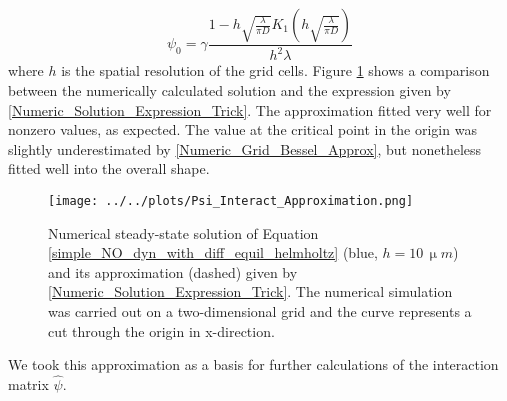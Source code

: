 \documentclass[10pt,a4paper]{article}
\begin{document}
\begin{equation}
\psi_0 = \gamma \frac{1-h\sqrt{\frac{\lambda}{\pi D}} K_1\left( h\sqrt{\frac{\lambda}{\pi D}}\right) }{h^2 \lambda}
\label{Numeric_Grid_Bessel_Approx}
\end{equation}
where $h$ is the spatial resolution of the grid cells. Figure \ref{Psi_Approximation_Compare} shows a comparison between the numerically calculated solution and the expression given by \ref{Numeric_Solution_Expression_Trick}. The approximation fitted very well for nonzero values, as expected. The value at the critical point in the origin was slightly underestimated by \eqref{Numeric_Grid_Bessel_Approx}, but nonetheless fitted well into the overall shape.
\begin{figure}
\begin{center}
\texttt{[image: ../../plots/Psi\_Interact\_Approximation.png]}
\end{center}
\caption[Numerical steady-state solution of Equation \eqref{simple_NO_dyn_with_diff_equil_helmholtz}]{Numerical steady-state solution of Equation \eqref{simple_NO_dyn_with_diff_equil_helmholtz} (blue, $h=10\, \upmu m$) and its approximation (dashed) given by \eqref{Numeric_Solution_Expression_Trick}. The numerical simulation was carried out on a two-dimensional grid and the curve represents a cut through the origin in x-direction.}
\label{Psi_Approximation_Compare}
\end{figure}
We took this approximation as a basis for further calculations of the interaction matrix $\hat{\psi}$.
\end{document}
